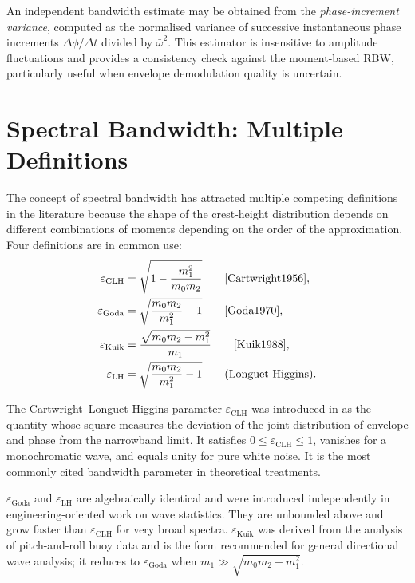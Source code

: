 \documentclass[journal]{IEEEtran}
\begin{document}
    An independent bandwidth estimate may be obtained from the
    \emph{phase-increment variance}, computed as the normalised variance
    of successive instantaneous phase increments $\Delta\phi/\Delta t$
    divided by $\bar\omega^2$.
    This estimator is insensitive to amplitude fluctuations and provides
    a consistency check against the moment-based RBW,
    particularly useful when envelope demodulation quality is uncertain.

    \section{Spectral Bandwidth: Multiple Definitions}
    \label{sec:bandwidth}

    The concept of spectral bandwidth has attracted multiple competing
    definitions in the literature because the shape of the crest-height
    distribution depends on different combinations of moments depending
    on the order of the approximation.
    Four definitions are in common use:
    \begin{align}
        \varepsilon_\mathrm{CLH} &= \sqrt{1 - \frac{m_1^2}{m_0 m_2}}
        \qquad\text{\cite{Cartwright1956}},
        \label{eq:eCLH}\\
        \varepsilon_\mathrm{Goda} &= \sqrt{\frac{m_0 m_2}{m_1^2} - 1}
        \qquad\text{\cite{Goda1970}},
        \label{eq:eGoda}\\
        \varepsilon_\mathrm{Kuik} &= \frac{\sqrt{m_0 m_2 - m_1^2}}{m_1}
        \qquad\text{\cite{Kuik1988}},
        \label{eq:eKuik}\\
        \varepsilon_\mathrm{LH} &= \sqrt{\frac{m_0 m_2}{m_1^2} - 1}
        \qquad\text{(Longuet-Higgins)}.
        \label{eq:eLH}
    \end{align}

    The Cartwright--Longuet-Higgins parameter $\varepsilon_\mathrm{CLH}$
    was introduced in \cite{Cartwright1956} as the quantity whose square
    measures the deviation of the joint distribution of envelope and
    phase from the narrowband limit.
    It satisfies $0 \le \varepsilon_\mathrm{CLH} \le 1$, vanishes for a
    monochromatic wave, and equals unity for pure white noise.
    It is the most commonly cited bandwidth parameter in theoretical
    treatments.

    $\varepsilon_\mathrm{Goda}$ and $\varepsilon_\mathrm{LH}$ are algebraically
    identical and were introduced independently in engineering-oriented
    work on wave statistics.
    They are unbounded above and grow faster than $\varepsilon_\mathrm{CLH}$
    for very broad spectra.
    $\varepsilon_\mathrm{Kuik}$ \cite{Kuik1988} was derived from the
    analysis of pitch-and-roll buoy data and is the form recommended
    for general directional wave analysis; it reduces to
    $\varepsilon_\mathrm{Goda}$ when $m_1 \gg \sqrt{m_0 m_2 - m_1^2}$.
\end{document}
